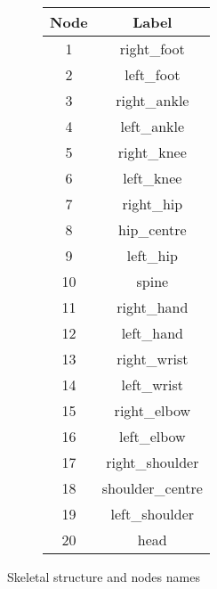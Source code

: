 \begin{figure}[H]
\begin{subfigure}[b]{0.7\linewidth}
  \end{subfigure}
  \label{fig:graph_skeletal}
  \begin{subfigure}[b]{0.29\linewidth}
    \centering
    \begin{table}[H]
      \centering
      \begin{tabular}{||c||c||}
        \hline
        \textbf{Node} & \textbf{Label} \\
        \hline
        1 & right\_foot \\
        2 & left\_foot \\
        3 & right\_ankle \\
        4 & left\_ankle \\
        5 & right\_knee \\
        6 & left\_knee \\
        7 & right\_hip \\
        8 & hip\_centre \\
        9 & left\_hip \\
        10 & spine \\
        11 & right\_hand \\
        12 & left\_hand \\
        13 & right\_wrist \\
        14 & left\_wrist \\
        15 & right\_elbow \\
        16 & left\_elbow \\
        17 & right\_shoulder \\
        18 & shoulder\_centre \\
        19 & left\_shoulder \\
        20 & head \\
        \hline
      \end{tabular}
    \end{table}
  \end{subfigure}
  \caption{Skeletal structure and nodes names}
  \label{tab:labels_joints}
\end{figure}


